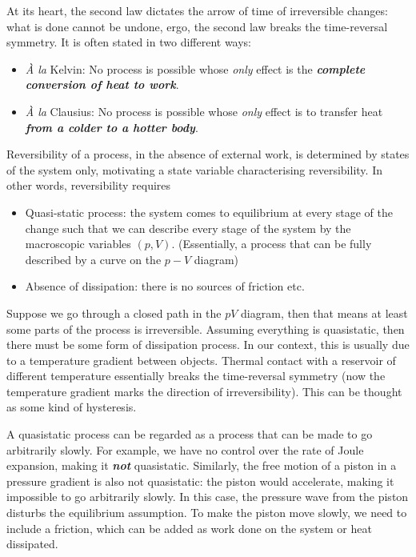 \documentclass{article}
\theoremstyle{nonumberplain}
\begin{document}
At its heart, the second law dictates the arrow of time of irreversible changes: what is done cannot be undone, ergo, the second law breaks the time-reversal symmetry. It is often stated in two different ways: 

\begin{itemize}
    \item \textit{\`{A} la} Kelvin: No process is possible whose \textit{only} effect is the \textit{\textbf{complete conversion of heat to work}}.
    \item  \textit{\`{A} la} Clausius: No process is possible whose \textit{only} effect is to transfer heat \textit{\textbf{from a colder to a hotter body}}. 
\end{itemize}


Reversibility of a process, in the absence of external work, is determined by states of the system only, motivating a state variable characterising reversibility. In other words, reversibility requires
\begin{itemize}
    \item Quasi-static process: the system comes to equilibrium at every stage of the change such that we can describe every stage of the system by the macroscopic variables $(p,V).$ (Essentially, a process that can be fully described by a curve on the $p-V$ diagram)
    \item Absence of dissipation: there is no sources of friction etc. 
\end{itemize}

Suppose we go through a closed path in the $pV$ diagram, then that means at least some parts of the process is irreversible. Assuming everything is quasistatic, then there must be some form of dissipation process. In our context, this is usually due to a temperature gradient between objects. Thermal contact with a reservoir of different temperature essentially breaks the time-reversal symmetry (now the temperature gradient marks the direction of irreversibility). This can be thought as some kind of hysteresis. 

A quasistatic process can be regarded as a process that can be made to go arbitrarily slowly. For example, we have no control over the rate of Joule expansion, making it \textit{\textbf{not}} quasistatic. Similarly, the free motion of a piston in a pressure gradient is also not quasistatic: the piston would accelerate, making it impossible to go arbitrarily slowly. In this case, the pressure wave from the piston disturbs the equilibrium assumption. To make the piston move slowly, we need to include a friction, which can be added as work done on the system or heat dissipated. 
\end{document}
